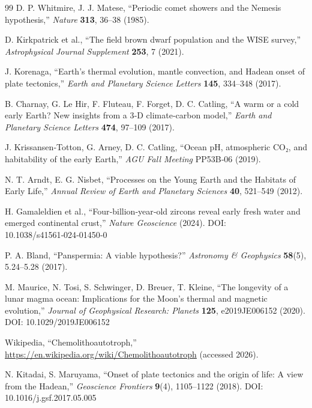 \documentclass[12pt,a4paper]{article}
\begin{document}
\begin{thebibliography}{99}
		D. P. Whitmire, J. J. Matese, ``Periodic comet showers and the Nemesis hypothesis,''
		\emph{Nature} \textbf{313}, 36–38 (1985).
		
		D. Kirkpatrick et al., ``The field brown dwarf population and the WISE survey,''
		\emph{Astrophysical Journal Supplement} \textbf{253}, 7 (2021).
		
		J. Korenaga, ``Earth’s thermal evolution, mantle convection, and Hadean onset of plate tectonics,''
		\emph{Earth and Planetary Science Letters} \textbf{145}, 334–348 (2017).
		
		B. Charnay, G. Le Hir, F. Fluteau, F. Forget, D. C. Catling, ``A warm or a cold early Earth? New insights from a 3‑D climate‑carbon model,''
		\emph{Earth and Planetary Science Letters} \textbf{474}, 97–109 (2017).
		
		J. Krissansen‑Totton, G. Arney, D. C. Catling, ``Ocean pH, atmospheric CO₂, and habitability of the early Earth,''
		\emph{AGU Fall Meeting} PP53B‑06 (2019).
		
		N. T. Arndt, E. G. Nisbet, ``Processes on the Young Earth and the Habitats of Early Life,''
		\emph{Annual Review of Earth and Planetary Sciences} \textbf{40}, 521–549 (2012).
		
		H. Gamaleldien et al., ``Four‑billion‑year‑old zircons reveal early fresh water and emerged continental crust,''
		\emph{Nature Geoscience} (2024). DOI: 10.1038/s41561‑024‑01450‑0
		
		P. A. Bland, ``Panspermia: A viable hypothesis?''
		\emph{Astronomy \& Geophysics} \textbf{58}(5), 5.24–5.28 (2017).
		
		M. Maurice, N. Tosi, S. Schwinger, D. Breuer, T. Kleine, ``The longevity of a lunar magma ocean: Implications for the Moon's thermal and magnetic evolution,''
		\emph{Journal of Geophysical Research: Planets} \textbf{125}, e2019JE006152 (2020). DOI: 10.1029/2019JE006152
		
		Wikipedia, ``Chemolithoautotroph,''
		\url{https://en.wikipedia.org/wiki/Chemolithoautotroph} (accessed 2026).
		
		N. Kitadai, S. Maruyama, ``Onset of plate tectonics and the origin of life: A view from the Hadean,''
		\emph{Geoscience Frontiers} \textbf{9}(4), 1105–1122 (2018). DOI: 10.1016/j.gsf.2017.05.005
		

\end{thebibliography}
\end{document}
